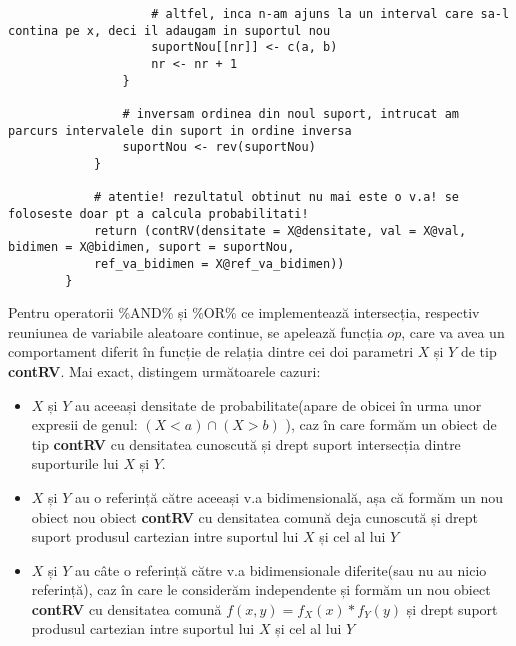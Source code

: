 \documentclass[12pt]{article}
\begin{document}
\begin{lstlisting}
					# altfel, inca n-am ajuns la un interval care sa-l contina pe x, deci il adaugam in suportul nou
					suportNou[[nr]] <- c(a, b)
					nr <- nr + 1
				}
				
				# inversam ordinea din noul suport, intrucat am parcurs intervalele din suport in ordine inversa
				suportNou <- rev(suportNou)
			}
			
			# atentie! rezultatul obtinut nu mai este o v.a! se foloseste doar pt a calcula probabilitati!
			return (contRV(densitate = X@densitate, val = X@val, bidimen = X@bidimen, suport = suportNou,
			ref_va_bidimen = X@ref_va_bidimen))
		}
	\end{lstlisting}\pagebreak
	
	Pentru operatorii \%AND\% și \%OR\% ce implementează intersecția, respectiv reuniunea de variabile aleatoare continue, se apelează funcția $op$, care va avea un comportament diferit în funcție de relația dintre cei doi parametri $X$ și $Y$ de tip \textbf{contRV}. Mai exact, distingem următoarele cazuri:
	\begin{itemize}
		\item $X$ și $Y$ au aceeași densitate de probabilitate(apare de obicei în urma unor expresii de genul: $(X < a) \cap (X > b)$ ), caz în care formăm un obiect de tip \textbf{contRV} cu densitatea cunoscută și drept suport intersecția dintre suporturile lui $X$ și $Y$.
		\item $X$ și $Y$ au o referință către aceeași v.a bidimensională, așa că formăm un nou obiect nou obiect \textbf{contRV} cu densitatea comună deja cunoscută și drept suport produsul cartezian intre suportul lui $X$ și cel al lui $Y$
		\item $X$ și $Y$ au câte o referință către v.a bidimensionale diferite(sau nu au nicio referință), caz în care le considerăm independente și formăm un nou obiect \textbf{contRV} cu densitatea comună $f(x, y) = f_X(x) * f_Y(y)$ și drept suport produsul cartezian intre suportul lui $X$ și cel al lui $Y$		
	\end{itemize}
\end{document}
